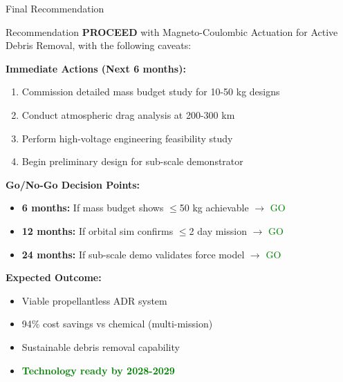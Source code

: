 \documentclass[11pt]{beamer}
\begin{document}
\begin{frame}{Final Recommendation}

\begin{block}{Recommendation}
\textbf{PROCEED} with Magneto-Coulombic Actuation for Active Debris Removal, with the following caveats:
\end{block}

\vspace{0.3cm}

\textbf{Immediate Actions (Next 6 months):}
\begin{enumerate}
\item Commission detailed mass budget study for 10-50 kg designs
\item Conduct atmospheric drag analysis at 200-300 km
\item Perform high-voltage engineering feasibility study
\item Begin preliminary design for sub-scale demonstrator
\end{enumerate}

\vspace{0.3cm}

\textbf{Go/No-Go Decision Points:}
\begin{itemize}
\item \textbf{6 months:} If mass budget shows $\leq$50 kg achievable $\rightarrow$ \textcolor{green}{GO}
\item \textbf{12 months:} If orbital sim confirms $\leq$2 day mission $\rightarrow$ \textcolor{green}{GO}
\item \textbf{24 months:} If sub-scale demo validates force model $\rightarrow$ \textcolor{green}{GO}
\end{itemize}

\vspace{0.3cm}

\textbf{Expected Outcome:}
\begin{itemize}
\item Viable propellantless ADR system
\item 94\% cost savings vs chemical (multi-mission)
\item Sustainable debris removal capability
\item \textcolor{green}{\textbf{Technology ready by 2028-2029}}
\end{itemize}

\end{frame}
\end{document}
